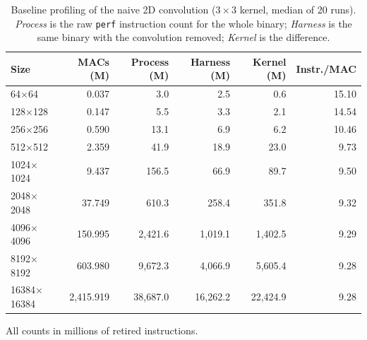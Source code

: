 \begin{table}[htbp]
\centering
\small
\caption{Baseline profiling of the naive 2D convolution ($3\times3$ kernel, median of 20 runs). \emph{Process} is the raw \texttt{perf} instruction count for the whole binary; \emph{Harness} is the same binary with the convolution removed; \emph{Kernel} is the difference.}
\label{tab:simd-baseline}
\begin{tabular}{lrrrrr}
\toprule
Size & MACs (M) & Process (M) & Harness (M) & Kernel (M) & Instr./MAC \\
\midrule
64$\times$64 & 0.037 & 3.0 & 2.5 & 0.6 & 15.10 \\
128$\times$128 & 0.147 & 5.5 & 3.3 & 2.1 & 14.54 \\
256$\times$256 & 0.590 & 13.1 & 6.9 & 6.2 & 10.46 \\
512$\times$512 & 2.359 & 41.9 & 18.9 & 23.0 & 9.73 \\
1024$\times$1024 & 9.437 & 156.5 & 66.9 & 89.7 & 9.50 \\
2048$\times$2048 & 37.749 & 610.3 & 258.4 & 351.8 & 9.32 \\
4096$\times$4096 & 150.995 & 2,421.6 & 1,019.1 & 1,402.5 & 9.29 \\
8192$\times$8192 & 603.980 & 9,672.3 & 4,066.9 & 5,605.4 & 9.28 \\
16384$\times$16384 & 2,415.919 & 38,687.0 & 16,262.2 & 22,424.9 & 9.28 \\
\bottomrule
\end{tabular}

\vspace{2pt}
\begin{minipage}{\linewidth}\footnotesize All counts in millions of retired instructions.\end{minipage}
\end{table}
